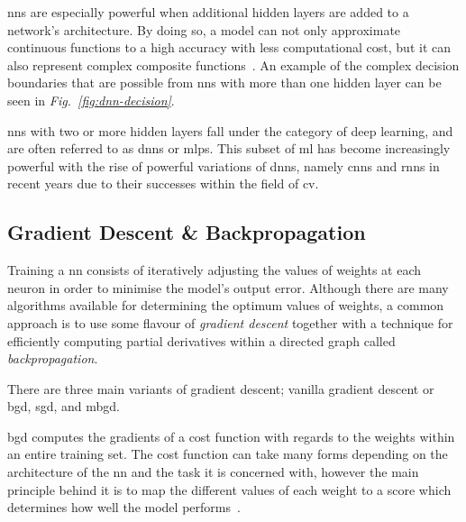 \glspl{nn} are especially powerful when additional hidden layers are
added to a network's architecture. By doing so, a model can not only approximate continuous functions
to a high accuracy with less computational cost, but it can also represent complex composite 
functions~\citep{sapkota2020}. An example of the complex decision boundaries that are possible from
\glspl{nn} with more than one hidden layer can be seen in \textit{Fig.~\ref{fig:dnn-decision}}.

\glspl{nn} with two or more hidden layers fall under the category of deep learning, and are often referred to as
\Glspl{dnn} or \Glspl{mlp}. This subset
of \gls{ml} has become increasingly powerful with the rise of powerful variations of \glspl{dnn}, namely \Glspl{cnn} and \Glspl{rnn} in recent years
due to their successes within the field of \gls{cv}.

\subsection{Gradient Descent \& Backpropagation}
Training a \gls{nn} consists of iteratively adjusting the values of weights at
each neuron in order to minimise the model's output error. Although there
are many algorithms available for determining the optimum values of weights, a common approach
is to use some flavour of \textit{gradient descent} 
together with a technique for efficiently computing partial derivatives within a directed graph called \textit{backpropagation}.

There are three main variants of gradient descent; vanilla gradient descent or \Gls{bgd}, \Gls{sgd}, and \Gls{mbgd}.

\gls{bgd} computes the gradients of a cost function with regards to the weights within an entire training set.
The cost function can take many forms depending on the architecture of the \gls{nn} and the task it is concerned with,
however the main principle behind it is to map the different
values of each weight to a score which determines how well the model performs~\citep{shung2018}.


